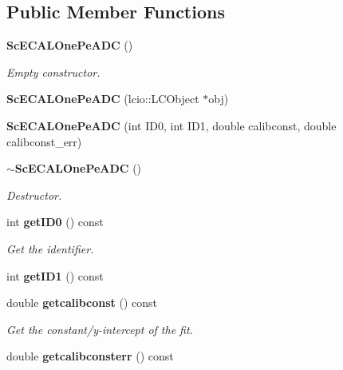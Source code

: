\subsection*{Public Member Functions}
\begin{DoxyCompactItemize}
\item 
{\bf Sc\-E\-C\-A\-L\-One\-Pe\-A\-D\-C} ()\label{classCALICE_1_1ScECALOnePeADC_ada5bb4f970cf3941319150b1654f0177}

\begin{DoxyCompactList}\small\item\em Empty constructor. \end{DoxyCompactList}\item 
{\bfseries Sc\-E\-C\-A\-L\-One\-Pe\-A\-D\-C} (lcio\-::\-L\-C\-Object $\ast$obj)\label{classCALICE_1_1ScECALOnePeADC_a6e329c1c96bbcfa394c39c8112ed37a0}

\item 
{\bfseries Sc\-E\-C\-A\-L\-One\-Pe\-A\-D\-C} (int I\-D0, int I\-D1, double calibconst, double calibconst\-\_\-err)\label{classCALICE_1_1ScECALOnePeADC_a94d545c07e0bbe9c8afa2fe7dcdd16ec}

\item 
{\bf $\sim$\-Sc\-E\-C\-A\-L\-One\-Pe\-A\-D\-C} ()\label{classCALICE_1_1ScECALOnePeADC_a98190ce37bb90d719a7c4018f17f219f}

\begin{DoxyCompactList}\small\item\em Destructor. \end{DoxyCompactList}\item 
int {\bf get\-I\-D0} () const \label{classCALICE_1_1ScECALOnePeADC_acf761b76b965891033defa4d5c101a7c}

\begin{DoxyCompactList}\small\item\em Get the identifier. \end{DoxyCompactList}\item 
int {\bfseries get\-I\-D1} () const \label{classCALICE_1_1ScECALOnePeADC_a4b5ea62b5831486c7f12446cc29ee43e}

\item 
double {\bf getcalibconst} () const \label{classCALICE_1_1ScECALOnePeADC_a65c6a5fcd63673f0ed1cfad68b2a06dc}

\begin{DoxyCompactList}\small\item\em Get the constant/y-\/intercept of the fit. \end{DoxyCompactList}\item 
double {\bf getcalibconsterr} () const \label{classCALICE_1_1ScECALOnePeADC_ace16918dad8b849ba42b4679ff027b2e}


\end{DoxyCompactItemize}
